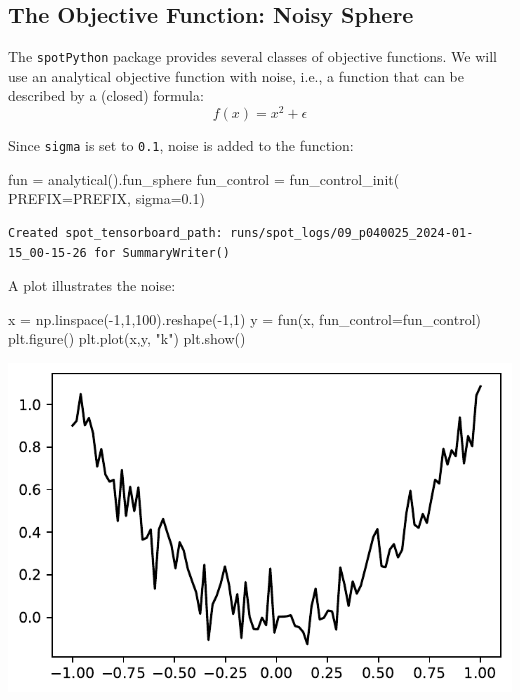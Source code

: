 \documentclass[
  letterpaper,
  DIV=11,
  numbers=noendperiod]{scrreprt}
\newenvironment{Shaded}{\begin{snugshade}}{\end{snugshade}}
\newcommand{\DecValTok}[1]{\textcolor[rgb]{0.68,0.00,0.00}{#1}}
\newcommand{\FloatTok}[1]{\textcolor[rgb]{0.68,0.00,0.00}{#1}}
\newcommand{\NormalTok}[1]{\textcolor[rgb]{0.00,0.23,0.31}{#1}}
\newcommand{\OperatorTok}[1]{\textcolor[rgb]{0.37,0.37,0.37}{#1}}
\newcommand{\StringTok}[1]{\textcolor[rgb]{0.13,0.47,0.30}{#1}}
\begin{document}
\subsection{The Objective Function: Noisy
Sphere}\label{the-objective-function-noisy-sphere-1}

The \texttt{spotPython} package provides several classes of objective
functions. We will use an analytical objective function with noise,
i.e., a function that can be described by a (closed) formula:
\[f(x) = x^2 + \epsilon\]

Since \texttt{sigma} is set to \texttt{0.1}, noise is added to the
function:

\begin{Shaded}
\begin{Highlighting}[]
\NormalTok{fun }\OperatorTok{=}\NormalTok{ analytical().fun\_sphere}
\NormalTok{fun\_control }\OperatorTok{=}\NormalTok{ fun\_control\_init(}
\NormalTok{    PREFIX}\OperatorTok{=}\NormalTok{PREFIX,}
\NormalTok{    sigma}\OperatorTok{=}\FloatTok{0.1}\NormalTok{)}
\end{Highlighting}
\end{Shaded}

\begin{verbatim}
Created spot_tensorboard_path: runs/spot_logs/09_p040025_2024-01-15_00-15-26 for SummaryWriter()
\end{verbatim}

A plot illustrates the noise:

\begin{Shaded}
\begin{Highlighting}[]
\NormalTok{x }\OperatorTok{=}\NormalTok{ np.linspace(}\OperatorTok{{-}}\DecValTok{1}\NormalTok{,}\DecValTok{1}\NormalTok{,}\DecValTok{100}\NormalTok{).reshape(}\OperatorTok{{-}}\DecValTok{1}\NormalTok{,}\DecValTok{1}\NormalTok{)}
\NormalTok{y }\OperatorTok{=}\NormalTok{ fun(x, fun\_control}\OperatorTok{=}\NormalTok{fun\_control)}
\NormalTok{plt.figure()}
\NormalTok{plt.plot(x,y, }\StringTok{"k"}\NormalTok{)}
\NormalTok{plt.show()}
\end{Highlighting}
\end{Shaded}

\includegraphics{014_num_spot_ocba_files/figure-pdf/cell-4-output-1.pdf}
\end{document}
